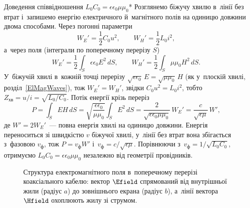 \begin{Example}{Доведення співвідношення $L_0C_0=\epsilon\epsilon_0\mu\mu_0$*}\small
	Розглянемо біжучу хвилю в~лінії без втрат і~запишемо енергію електричного й~магнітного полів на одиницю довжини двома
	способами. Через погонні параметри
	\begin{equation*}
		W_E' = \frac{1}{2} C_0 u^2, \qquad W_H' = \frac{1}{2} L_0 i^2,
	\end{equation*}
	а~через поля (інтеграли по поперечному перерізу $S$)
	\begin{equation*}
		W_E' = \frac{1}{2}\int_S \epsilon\epsilon_0 E^2 \, dS, \qquad W_H' = \frac{1}{2}\int_S \mu\mu_0 H^2 \, dS.
	\end{equation*}
	У~біжучій хвилі в~кожній точці перерізу $\sqrt{\epsilon\epsilon_0}\,E = \sqrt{\mu\mu_0}\,H$ (як у~плоскій хвилі, розділ~\ref{ElMagWaves}), тож $W_E' = W_H'$, звідки
	$C_0 u^2 = L_0 i^2$, тобто $Z_{\text{хв}} = u/i = \sqrt{L_0/C_0}$. Потік енергії крізь переріз
	\begin{equation*}
		P = \int_S E H \, dS = \sqrt{\frac{\epsilon\epsilon_0}{\mu\mu_0}}\int_S E^2 \, dS
		= \frac{2}{\sqrt{\epsilon\epsilon_0\mu\mu_0}}\,W_E' = \frac{c}{\sqrt{\epsilon\mu}}\,W',
	\end{equation*}
	де $W' = 2W_E'$~--- повна енергія хвилі на одиницю довжини. Енергія переноситься зі швидкістю $v$ біжучої хвилі, у~лінії без втрат вона збігається з~фазовою $v_{\text{ф}}$, тож
	$P = v_{\text{ф}} W'$ і~$v_{\text{ф}} = c/\sqrt{\epsilon\mu}$. Порівнюючи з~$v_{\text{ф}} = 1/\sqrt{L_0 C_0}$, отримуємо
	$L_0 C_0 = \epsilon\epsilon_0\mu\mu_0$ незалежно від геометрії провідників.
\end{Example}

\begin{figure}[tbp]
	\centering
	\caption{Структура електромагнітного поля в~поперечному перерізі коаксіального кабелю: вектор $\Efield$ спрямований від внутрішньої жили (радіус $a$) до зовнішнього екрана (радіус $b$), а~лінії вектора $\Hfield$ охоплюють жилу зі струмом.}
	\label{fig:line_cross_section}
\end{figure}

